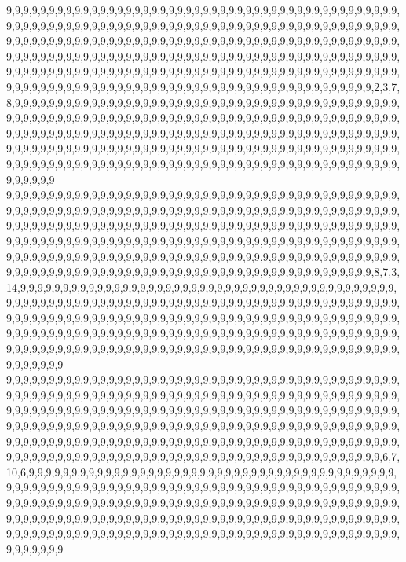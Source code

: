 9,9,9,9,9,9,9,9,9,9,9,9,9,9,9,9,9,9,9,9,9,9,9,9,9,9,9,9,9,9,9,9,9,9,9,9,9,9,9,9,9,9,9,9,9,9,9,9,9,9,9,9,9,9,9,9,9,9,9,9,9,9,9,9,9,9,9,9,9,9,9,9,9,9,9,9,9,9,9,9,9,9,9,9,9,9,9,9,9,9,9,9,9,9,9,9,9,9,9,9,9,9,9,9,9,9,9,9,9,9,9,9,9,9,9,9,9,9,9,9,9,9,9,9,9,9,9,9,9,9,9,9,9,9,9,9,9,9,9,9,9,9,9,9,9,9,9,9,9,9,9,9,9,9,9,9,9,9,9,9,9,9,9,9,9,9,9,9,9,9,9,9,9,9,9,9,9,9,9,9,9,9,9,9,9,9,9,9,9,9,9,9,9,9,9,9,9,9,9,9,9,9,9,9,9,9,9,9,9,9,9,9,9,9,9,9,9,9,9,9,9,9,9,9,9,9,9,9,9,9,9,9,9,9,9,9,9,9,9,9,9,9,9,9,9,9,9,9,9,9,9,9,9,9,9,9,9,9,9,9,9,9,9,9,9,9,9,9,9,9,9,9,9,2,3,7,8,9,9,9,9,9,9,9,9,9,9,9,9,9,9,9,9,9,9,9,9,9,9,9,9,9,9,9,9,9,9,9,9,9,9,9,9,9,9,9,9,9,9,9,9,9,9,9,9,9,9,9,9,9,9,9,9,9,9,9,9,9,9,9,9,9,9,9,9,9,9,9,9,9,9,9,9,9,9,9,9,9,9,9,9,9,9,9,9,9,9,9,9,9,9,9,9,9,9,9,9,9,9,9,9,9,9,9,9,9,9,9,9,9,9,9,9,9,9,9,9,9,9,9,9,9,9,9,9,9,9,9,9,9,9,9,9,9,9,9,9,9,9,9,9,9,9,9,9,9,9,9,9,9,9,9,9,9,9,9,9,9,9,9,9,9,9,9,9,9,9,9,9,9,9,9,9,9,9,9,9,9,9,9,9,9,9,9,9,9,9,9,9,9,9,9,9,9,9,9,9,9,9,9,9,9,9,9,9,9,9,9,9,9,9,9,9,9,9,9,9,9,9,9,9,9,9,9,9,9,9,9,9,9,9,9
9,9,9,9,9,9,9,9,9,9,9,9,9,9,9,9,9,9,9,9,9,9,9,9,9,9,9,9,9,9,9,9,9,9,9,9,9,9,9,9,9,9,9,9,9,9,9,9,9,9,9,9,9,9,9,9,9,9,9,9,9,9,9,9,9,9,9,9,9,9,9,9,9,9,9,9,9,9,9,9,9,9,9,9,9,9,9,9,9,9,9,9,9,9,9,9,9,9,9,9,9,9,9,9,9,9,9,9,9,9,9,9,9,9,9,9,9,9,9,9,9,9,9,9,9,9,9,9,9,9,9,9,9,9,9,9,9,9,9,9,9,9,9,9,9,9,9,9,9,9,9,9,9,9,9,9,9,9,9,9,9,9,9,9,9,9,9,9,9,9,9,9,9,9,9,9,9,9,9,9,9,9,9,9,9,9,9,9,9,9,9,9,9,9,9,9,9,9,9,9,9,9,9,9,9,9,9,9,9,9,9,9,9,9,9,9,9,9,9,9,9,9,9,9,9,9,9,9,9,9,9,9,9,9,9,9,9,9,9,9,9,9,9,9,9,9,9,9,9,9,9,9,9,9,9,9,9,9,9,9,9,9,9,9,9,9,9,9,9,9,9,9,9,8,7,3,14,9,9,9,9,9,9,9,9,9,9,9,9,9,9,9,9,9,9,9,9,9,9,9,9,9,9,9,9,9,9,9,9,9,9,9,9,9,9,9,9,9,9,9,9,9,9,9,9,9,9,9,9,9,9,9,9,9,9,9,9,9,9,9,9,9,9,9,9,9,9,9,9,9,9,9,9,9,9,9,9,9,9,9,9,9,9,9,9,9,9,9,9,9,9,9,9,9,9,9,9,9,9,9,9,9,9,9,9,9,9,9,9,9,9,9,9,9,9,9,9,9,9,9,9,9,9,9,9,9,9,9,9,9,9,9,9,9,9,9,9,9,9,9,9,9,9,9,9,9,9,9,9,9,9,9,9,9,9,9,9,9,9,9,9,9,9,9,9,9,9,9,9,9,9,9,9,9,9,9,9,9,9,9,9,9,9,9,9,9,9,9,9,9,9,9,9,9,9,9,9,9,9,9,9,9,9,9,9,9,9,9,9,9,9,9,9,9,9,9,9,9,9,9,9,9,9,9,9,9,9,9,9,9,9,9
9,9,9,9,9,9,9,9,9,9,9,9,9,9,9,9,9,9,9,9,9,9,9,9,9,9,9,9,9,9,9,9,9,9,9,9,9,9,9,9,9,9,9,9,9,9,9,9,9,9,9,9,9,9,9,9,9,9,9,9,9,9,9,9,9,9,9,9,9,9,9,9,9,9,9,9,9,9,9,9,9,9,9,9,9,9,9,9,9,9,9,9,9,9,9,9,9,9,9,9,9,9,9,9,9,9,9,9,9,9,9,9,9,9,9,9,9,9,9,9,9,9,9,9,9,9,9,9,9,9,9,9,9,9,9,9,9,9,9,9,9,9,9,9,9,9,9,9,9,9,9,9,9,9,9,9,9,9,9,9,9,9,9,9,9,9,9,9,9,9,9,9,9,9,9,9,9,9,9,9,9,9,9,9,9,9,9,9,9,9,9,9,9,9,9,9,9,9,9,9,9,9,9,9,9,9,9,9,9,9,9,9,9,9,9,9,9,9,9,9,9,9,9,9,9,9,9,9,9,9,9,9,9,9,9,9,9,9,9,9,9,9,9,9,9,9,9,9,9,9,9,9,9,9,9,9,9,9,9,9,9,9,9,9,9,9,9,9,9,9,9,9,9,9,6,7,10,6,9,9,9,9,9,9,9,9,9,9,9,9,9,9,9,9,9,9,9,9,9,9,9,9,9,9,9,9,9,9,9,9,9,9,9,9,9,9,9,9,9,9,9,9,9,9,9,9,9,9,9,9,9,9,9,9,9,9,9,9,9,9,9,9,9,9,9,9,9,9,9,9,9,9,9,9,9,9,9,9,9,9,9,9,9,9,9,9,9,9,9,9,9,9,9,9,9,9,9,9,9,9,9,9,9,9,9,9,9,9,9,9,9,9,9,9,9,9,9,9,9,9,9,9,9,9,9,9,9,9,9,9,9,9,9,9,9,9,9,9,9,9,9,9,9,9,9,9,9,9,9,9,9,9,9,9,9,9,9,9,9,9,9,9,9,9,9,9,9,9,9,9,9,9,9,9,9,9,9,9,9,9,9,9,9,9,9,9,9,9,9,9,9,9,9,9,9,9,9,9,9,9,9,9,9,9,9,9,9,9,9,9,9,9,9,9,9,9,9,9,9,9,9,9,9,9,9,9,9,9,9,9,9,9
